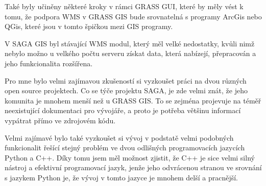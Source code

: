 \documentclass[a4paper,12pt]{article}
\begin{document}
Také byly učiněny některé kroky v rámci GRASS GUI, které by měly vést
k tomu, že podpora WMS v GRASS GIS bude srovnatelná s programy ArcGis
nebo QGis, které jsou v tomto špičkou mezi GIS programy.

V SAGA GIS byl stávající WMS modul, který měl velké nedostatky, kvůli
nimž nebylo možno u velkého počtu serveru získat data, která nabízejí,
přepracován a jeho funkcionalita rozšířena.

Pro mne bylo velmi zajímavou zkušeností si vyzkoušet práci na dvou
různých open source projektech. Co se týče projektu SAGA, je zde velmi
znát, že jeho komunita je mnohem menší než u GRASS GIS. To se zejména
projevuje na téměř neexistující dokumentaci pro vývojáře, a proto je
potřeba většinu informací vypátrat přímo ve zdrojovém kódu.

Velmi zajímavé bylo také vyzkoušet si vývoj v podstatě velmi podobných
funkcionalit řešící stejný problém ve dvou odlišných programovacích
jazycích Python a C++.  Díky tomu jsem měl možnost zjistit, že C++ je
sice velmi silný nástroj a efektivní programovací jazyk, jenže jeho
odvrácenou stranou ve srovnání s jazykem Python je, že vývoj v tomto
jazyce je mnohem delší a pracnější.
\end{document}
